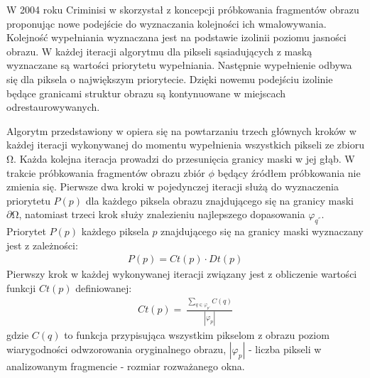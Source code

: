 \documentclass[12pt, twoside, openany]{report}
\theoremstyle{definition}
\begin{document}
\par
W 2004 roku Criminisi w \cite{criminisi2004region} skorzystał z koncepcji próbkowania fragmentów obrazu proponując nowe podejście do wyznaczania kolejności ich wmalowywania.  Kolejność wypełniania wyznaczana jest na podstawie izolinii poziomu jasności obrazu. W każdej iteracji algorytmu dla pikseli sąsiadujących z maską wyznaczane są wartości priorytetu wypełniania. Następnie wypełnienie odbywa się dla piksela o największym priorytecie. Dzięki nowemu podejściu izolinie będące granicami struktur obrazu są kontynuowane w miejscach odrestaurowywanych.
\par
Algorytm przedstawiony w \cite{criminisi2004region} opiera się na powtarzaniu trzech głównych kroków w każdej iteracji wykonywanej do momentu wypełnienia wszystkich pikseli ze zbioru $\mathrm{\Omega }$. Każda kolejna iteracja prowadzi do przesunięcia granicy maski w jej głąb. W trakcie próbkowania fragmentów obrazu zbiór $\phi $ będący źródłem próbkowania nie zmienia się. Pierwsze dwa kroki w pojedynczej iteracji służą do wyznaczenia priorytetu $P\left(p\right)$ dla każdego piksela obrazu znajdującego się na granicy maski $\partial \mathrm{\Omega }$, natomiast trzeci krok służy znalezieniu najlepszego dopasowania ${\varphi }_{q^{''}}$. Priorytet $P\left(p\right)$ każdego piksela $p$ znajdującego się na granicy maski wyznaczany jest z zależności:
\begin{align}
P\left(p\right)=Ct(p)\cdot Dt(p)
\label{PRIORITY}
\end{align}
Pierwszy krok w każdej wykonywanej iteracji związany jest z obliczenie wartości funkcji $Ct(p)$ definiowanej:
\begin{align}
Ct\left(p\right)=\ \frac{\sum_{q\in {\varphi }_{p'}}{C(q)}}{\left|{\varphi }_p\right|}
\label{confidenceTerm}
\end{align}
gdzie $C(q)$ to funkcja przypisująca wszystkim pikselom z obrazu poziom wiarygodności odwzorowania oryginalnego obrazu, $\left|{\varphi }_p\right|$ - liczba pikseli w analizowanym fragmencie - rozmiar rozważanego okna. 
\par
\end{document}
